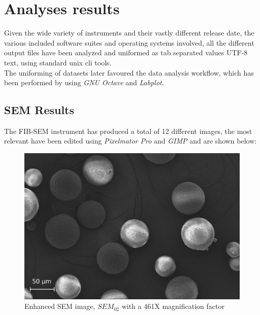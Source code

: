 \documentclass[a4paper]{article}
\begin{document}
      \section{Analyses results\label{analyses_results_general}}

      Given the wide variety of instruments and their vastly different release date, the various included software suites and operating systems involved,
      all the different output files have been analyzed and uniformed as tab separated values UTF-8 text, using standard unix cli tools. \\ 
      
      The uniforming of datasets later favoured the data analysis workflow, which has been performed by using \textit{GNU Octave} and \textit{Labplot}. \\

      \subsection{SEM Results\label{SEM_analysis_results}}

                
      The FIB-SEM instrument has produced a total of 12 different images, the most relevant have been edited using 
      \textit{Pixelmator Pro} and \textit{GIMP} and are shown below: \\


          \begin{figure}[ht]
              \centering 
              \includegraphics[width=\textwidth]{Pictures/SEM/Edited/04_02.eps}
              \caption{Enhanced SEM image, $SEM_{02}$ with a 461X magnification factor}
              \label{fig:SEM_02}
          \end{figure}
\end{document}
